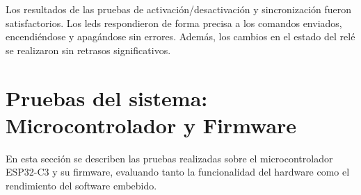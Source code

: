 Los resultados de las pruebas de activación/desactivación y sincronización fueron satisfactorios. Los leds respondieron de forma precisa a los comandos enviados, encendiéndose y apagándose sin errores. Además, los cambios en el estado del relé se realizaron sin retrasos significativos.



\section{Pruebas del sistema: Microcontrolador y Firmware}

En esta sección se describen las pruebas realizadas sobre el microcontrolador ESP32-C3 y su firmware, evaluando tanto la funcionalidad del hardware como el rendimiento del software embebido.


